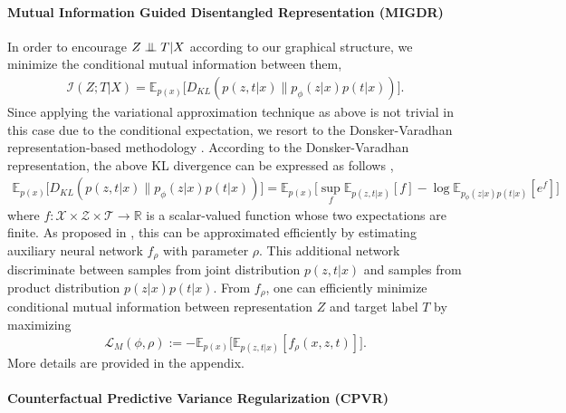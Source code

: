 \documentclass{article}
\begin{document}
\paragraph{Mutual Information Guided Disentangled Representation (MIGDR)}

In order to encourage $Z \perp\mkern-10mu\perp T |X$ according to our graphical structure, we minimize the conditional mutual information between them,
    \begin{align*}
        \mathcal{I}(Z;T|X) = \mathbb{E}_{p(x)}\big[D_{KL}(p(z,t|x)\|p_{\phi}(z|x)p(t|x))\big].
    \end{align*}
    Since applying the variational approximation technique as above is not trivial in this case due to the conditional expectation, we resort to the Donsker-Varadhan representation-based methodology \cite{MD1983}. According to the Donsker-Varadhan representation, the above KL divergence can be expressed as follows \cite{Belghazi18},
    \begin{align*}
\mathbb{E}_{p(x)}\big[D_{KL}(p(z,t|x)\|p_{\phi}(z|x)p(t|x))\big]
        =\mathbb{E}_{p(x)}\Big[\sup_{f} \mathbb{E}_{p(z,t|x)}[f] - \log \mathbb{E}_{p_{\phi}(z|x)p(t|x)}[e^{f}]\Big]
    \end{align*}
    where $f : \mathcal{X} \times \mathcal{Z} \times \mathcal{T} \rightarrow \mathbb{R}$ is a scalar-valued function whose two expectations are finite. As proposed in \cite{Belghazi18}, this can be approximated efficiently by estimating auxiliary neural network $f_\rho$ with parameter $\rho$. This additional network discriminate between samples from joint distribution $p(z,t|x)$ and samples from product distribution $p(z|x)p(t|x)$. From $f_\rho$, one can efficiently minimize conditional mutual information between representation $Z$ and target label $T$ by maximizing
    \begin{equation}
        \mathcal{L}_{M}(\phi, \rho) {:=}  -\mathbb{E}_{p(x)}\big[ \mathbb{E}_{p(z,t|x)}[f_{\rho}(x,z,t) ] \big] .
    \end{equation}
    More details are provided in the appendix.

\paragraph{Counterfactual Predictive Variance Regularization (CPVR)}
\end{document}
